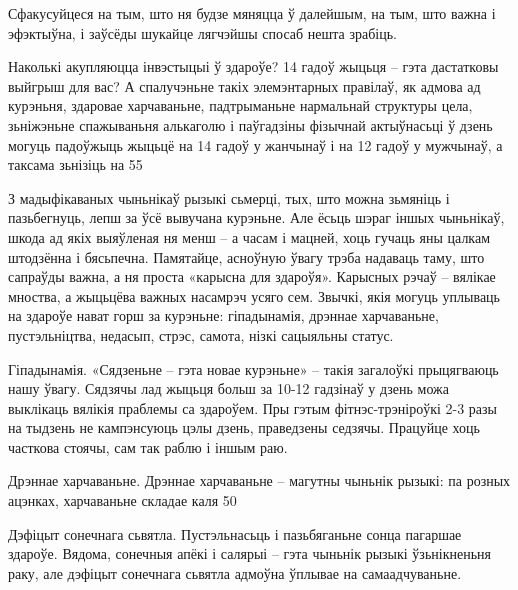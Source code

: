 Сфакусуйцеся на тым, што ня будзе мяняцца ў далейшым, на тым, што важна і эфэктыўна, і заўсёды шукайце лягчэйшы спосаб нешта зрабіць.

Наколькі акупляюцца інвэстыцыі ў здароўе? 14 гадоў жыцьця – гэта дастатковы выйгрыш для вас? А спалучэньне такіх элемэнтарных правілаў, як адмова ад курэньня, здаровае харчаваньне, падтрыманьне нармальнай структуры цела, зьніжэньне спажываньня алькаголю і паўгадзіны фізычнай актыўнасьці ў дзень могуць падоўжыць жыцьцё на 14 гадоў у жанчынаў і на 12 гадоў у мужчынаў, а таксама зьнізіць на 55%

З мадыфікаваных чыньнікаў рызыкі сьмерці, тых, што можна зьмяніць і пазьбегнуць, лепш за ўсё вывучана курэньне. Але ёсьць шэраг іншых чыньнікаў, шкода ад якіх выяўленая ня менш – а часам і мацней, хоць гучаць яны цалкам штодзённа і бясьпечна. Памятайце, асноўную ўвагу трэба надаваць таму, што сапраўды важна, а ня проста «карысна для здароўя». Карысных рэчаў – вялікае мноства, а жыцьцёва важных насамрэч усяго сем. Звычкі, якія могуць уплываць на здароўе нават горш за курэньне: гіпадынамія, дрэннае харчаваньне, пустэльніцтва, недасып, стрэс, самота, нізкі сацыяльны статус.

Гіпадынамія. «Сядзеньне – гэта новае курэньне» – такія загалоўкі прыцягваюць нашу ўвагу. Сядзячы лад жыцьця больш за 10-12 гадзінаў у дзень можа выклікаць вялікія праблемы са здароўем. Пры гэтым фітнэс-трэніроўкі 2-3 разы на тыдзень не кампэнсуюць цэлы дзень, праведзены седзячы. Працуйце хоць часткова стоячы, сам так раблю і іншым раю.

Дрэннае харчаваньне. Дрэннае харчаваньне – магутны чыньнік рызыкі: па розных ацэнках, харчаваньне складае каля 50%

Дэфіцыт сонечнага сьвятла. Пустэльнасьць і пазьбяганьне сонца пагаршае здароўе. Вядома, сонечныя апёкі і салярыі – гэта чыньнік рызыкі ўзьнікненьня раку, але дэфіцыт сонечнага сьвятла адмоўна ўплывае на самаадчуваньне.

